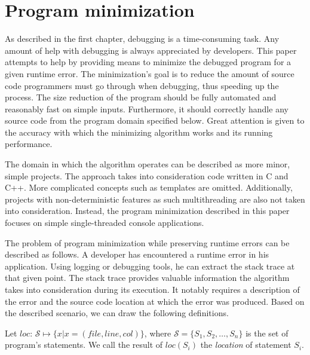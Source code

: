 \chapter{Program minimization}

As described in the first chapter, debugging is a time-consuming task.
Any amount of help with debugging is always appreciated by developers.
This paper attempts to help by providing means to minimize the debugged
program for a given runtime error.
The minimization's goal is to reduce the amount of source code programmers 
must go through when debugging, thus speeding up the process.
The size reduction of the program should be fully automated and reasonably 
fast on simple inputs.
Furthermore, it should correctly handle any source code from the program 
domain specified below.
Great attention is given to the accuracy with which the minimizing algorithm 
works and its running performance.


The domain in which the algorithm operates can be described as more minor, 
simple projects.
The approach takes into consideration code written in C and C++.
More complicated concepts such as templates are omitted.
Additionally, projects with non-deterministic features as such multithreading 
are also not taken into consideration.
Instead, the program minimization described in this paper focuses 
on simple single-threaded console applications.

The problem of program minimization while preserving runtime errors can be 
described as follows.
A developer has encountered a runtime error in his application.
Using logging or debugging tools, he can extract the stack trace at that 
given point.
The stack trace provides valuable information the algorithm takes into 
consideration during its execution.
It notably requires a description of the error and the source code 
location at which the error was produced.
Based on the described scenario, we can draw the following definitions.

\begin{defn}[Location]\label{def04:1}
  Let $loc$: $\mathcal{S} \mapsto \{x | x = (file, line, col)\}$, 
  where $\mathcal{S} = \{S_1, S_2, \ldots, S_n\}$ 
  is the set of program's statements.
  We call the result of $loc(S_i)$ the \emph{location} of statement $S_i$.
\end{defn}

